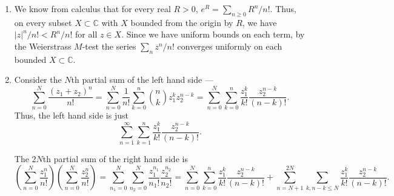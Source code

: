 \documentclass[12 pt, letterpaper]{hmcpset}
\begin{document}
\begin{solution}
	\begin{enumerate}
		\item We know from calculus that for every real $R > 0$,  $e^{R} = \sum_{n \ge 0} R^{n}/n!$. Thus, on every subset $X \subset \mathbb{C}$ with $X$ bounded from the origin by $R$, we have $\lvert z \rvert^{n} / n! < R^{n} / n!$ for all $z \in X$. Since we have uniform bounds on each term, by the Weierstrass $M$-test the series $\sum_{n} z^{n} / n!$ converges uniformly on each bounded $X \subset \mathbb{C}$.
		\item Consider the $N$th partial sum of the left hand side ---
			\[
				 \sum_{n = 0}^{N} \frac{(z_{1} + z_{2})^{n}}{n!} = \sum_{n = 0}^{N} \frac{1}{n!} \sum_{k = 0}^{n} \binom{n}{k} z_{1}^{k} z_{2}^{n - k} = \sum_{n = 0}^{N} \sum_{k = 0}^{n} \frac{z_{1}^{k}}{k!} \frac{z_{2}^{n - k}}{(n - k)!}.
			\]
			Thus, the left hand side is just
			\[
				\sum_{n = 1}^{\infty} \sum_{k = 1}^{n} \frac{z_{1}^{k}}{k!} \frac{z_{2}^{n - k}}{(n - k)!}.
			\]

			The $2N$th partial sum of the right hand side is
			\[
				\left ( \sum_{n = 0}^{N} \frac{z_{1}^{n}}{n!} \right ) \left ( \sum_{n = 0}^{N} \frac{z_{2}^{n}}{n!} \right ) = \sum_{n_{1} = 0}^{N} \sum_{n_{2} = 0}^{N} \frac{z_{1}^{n_{1}}}{n_{1}!} \frac{z_{2}^{n_{2}}}{n_{2}!} = \sum_{n = 0}^{N} \sum_{k = 0}^{n} \frac{z_{1}^{k}}{k!} \frac{z_{2}^{n - k}}{(n - k)!} + \sum_{n = N + 1}^{2N} \sum_{k, n - k \le N} \frac{z_{1}^{k}}{k!} \frac{z_{2}^{n - k}}{(n - k)!}.
			\]


\end{enumerate}
\end{solution}
\end{document}
